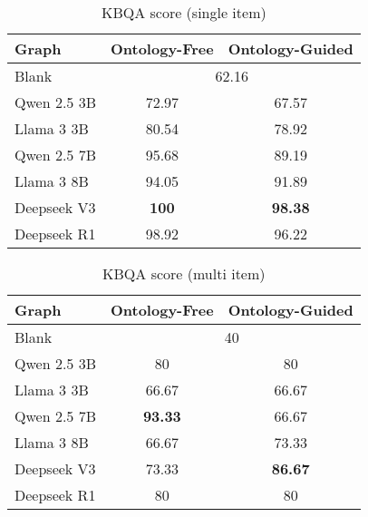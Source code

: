 \documentclass[a4, conference]{IEEEtran}
\begin{document}
\begin{table}[h]
    \centering
    \caption{KBQA score (single item)}
    \label{tab:qa_percent_single}
    \begin{tabular}{|l|c|c|}
        \hline
        Graph       & Ontology-Free               & Ontology-Guided \\
        \hline
        Blank       & \multicolumn{2}{|c|}{62.16}                   \\
        \hline
        Qwen 2.5 3B & 72.97                       & 67.57           \\
        \hline
        Llama 3 3B  & 80.54                       & 78.92           \\
        \hline
        Qwen 2.5 7B & 95.68                       & 89.19           \\
        \hline
        Llama 3 8B  & 94.05                       & 91.89           \\
        \hline
        Deepseek V3 & \textbf{100}                & \textbf{98.38}  \\
        \hline
        Deepseek R1 & 98.92                       & 96.22           \\
        \hline
    \end{tabular}
\end{table}

\begin{table}[h]
    \centering
    \caption{KBQA score (multi item)}
    \label{tab:qa_percent_multi}
    \begin{tabular}{|l|c|c|}
        \hline
        Graph       & Ontology-Free            & Ontology-Guided \\
        \hline
        Blank       & \multicolumn{2}{|c|}{40}                   \\
        \hline
        Qwen 2.5 3B & 80                       & 80              \\
        \hline
        Llama 3 3B  & 66.67                    & 66.67           \\
        \hline
        Qwen 2.5 7B & \textbf{93.33}           & 66.67           \\
        \hline
        Llama 3 8B  & 66.67                    & 73.33           \\
        \hline
        Deepseek V3 & 73.33                    & \textbf{86.67}  \\
        \hline
        Deepseek R1 & 80                       & 80              \\
        \hline
    \end{tabular}
\end{table}
\end{document}
